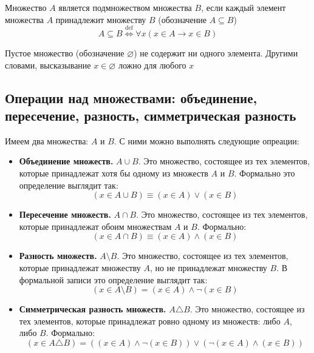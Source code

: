 \documentclass[a4paper]{article}
\begin{document}
 Множество $A$ является подмножеством множества $B$, если каждый элемент множества $A$ принадлежит множеству $B$ (обозначение $A\subseteq B$)
\begin{equation*}
    A\subseteq B \overset{\text{def}}{\Longleftrightarrow}\forall x(x\in A\rightarrow x\in B)
\end{equation*}

 Пустое множество (обозначение $\varnothing$) не содержит ни одного элемента.
Другими словами, высказывание $x\in\varnothing$ ложно для любого $x$

\subsection{Операции над множествами: объединение, пересечение, разность, симметрическая разность}
Имеем два множества: $A$ и $B$. С ними можно выполнять следующие опреации:
\begin{itemize}
    \item \textbf{Объединение множеств.} $A\cup B$. Это множество, состоящее из тех элементов, которые принадлежат хотя бы одному из множеств $A$ и $B$. Формально это определение выглядит так:
    \begin{equation*}
        (x\in A\cup B)\equiv(x\in A)\vee(x\in B)
    \end{equation*}
    \item \textbf{Пересечение множеств.} $A\cap B$. Это множество, состоящее из тех элементов, которые принадлежат обоим множествам $A$ и $B$. Формально:
    \begin{equation*}
        (x\in A\cap B)\equiv(x\in A)\wedge(x\in B)
    \end{equation*}
    \item \textbf{Разность множеств.} $A\setminus B$. Это множество, состоящее из тех элементов, которые принадлежат множеству $A$, но не принадлежат множеству $B$. В формальной записи это определение выглядит так:
    \begin{equation*}
        (x\in A\setminus B)=(x\in A)\wedge \neg(x\in B)
    \end{equation*}
    \item \textbf{Симметрическая разность множеств.} $A\triangle B$. Это множество, состоящее из тех элементов, которые принадлежат ровно одному из множеств: либо $A$, либо $B$. Формально:
    \begin{equation*}
        (x\in A\triangle B)=((x\in A)\wedge\neg(x\in B))\vee(\neg(x\in A)\wedge(x\in B))
    \end{equation*}
\end{itemize}
\end{document}
